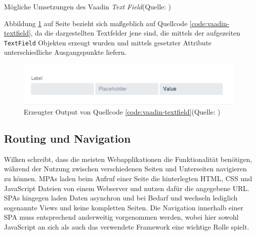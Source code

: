 \documentclass[a4paper,12pt,twoside]{scrreprt}
\begin{document}
\begin{listing}[ht]
    \inputminted[fontsize=\footnotesize,linenos]{java}{code/Vaadin_text-field_sample.java}
    \caption[Mögliche Umsetzungen des Vaadin \textit{Text Field}]{Mögliche Umsetzungen des Vaadin \textit{Text Field}\newline(Quelle: \cite[][\enquote{Text Field} - Examples]{vaadin_ltd_mobile_nodate})}
    \label{code:vaadin-textfield}
\end{listing}

Abbildung \ref{fig:vaadin-textfield-output} auf Seite \pageref{fig:vaadin-textfield-output} bezieht sich maßgeblich auf Quellcode \ref{code:vaadin-textfield}, da die dargestellten Textfelder jene sind, die mittels der aufgezeiten \texttt{TextField} Objekten erzeugt wurden und mittels gesetzter Attribute unterschiedliche Ausgangspunkte liefern.

\begin{figure}[ht]
    \centering
    \includegraphics[scale=0.7]{images/Vaadin_text-field_output_Vaadin.png}
    \caption[Erzeugter Output von Quellcode \ref{code:vaadin-textfield}]{Erzeugter Output von Quellcode \ref{code:vaadin-textfield}\newline(Quelle: \cite[][\enquote{Text Field} - Examples]{vaadin_ltd_mobile_nodate})}
    \label{fig:vaadin-textfield-output}
\end{figure}

\subsection{Routing und Navigation}
\label{sub-sec:routing-navigation}
Wilken schreibt, dass die meisten Webapplikationen die Funktionalität benötigen, während der Nutzung zwischen verschiedenen Seiten und Unterseiten navigieren zu können. \aclp{MPA} laden beim Aufruf einer Seite die hinterlegten HTML, CSS und JavaScript Dateien von einem Webserver und nutzen dafür die angegebene URL. \aclp{SPA} hingegen laden Daten asynchron und bei Bedarf und wechseln lediglich sogenannte Views und keine kompletten Seiten. Die Navigation innerhalb einer \acs{SPA} muss entsprechend anderweitig vorgenommen werden, wobei hier sowohl JavaScript an sich als auch das verwendete Framework eine wichtige Rolle spielt. \parencite[][Seite 159f.]{wilken_angular_2018}
\end{document}
